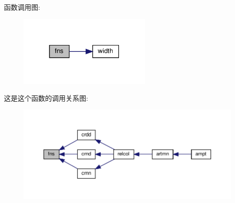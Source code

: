 函数调用图\+:
\nopagebreak
\begin{figure}[H]
\begin{center}
\leavevmode
\includegraphics[width=186pt]{fns_8f90_acb8b677be8ff0a35acfaf255b2cd7efd_cgraph}
\end{center}
\end{figure}
这是这个函数的调用关系图\+:
\nopagebreak
\begin{figure}[H]
\begin{center}
\leavevmode
\includegraphics[width=350pt]{fns_8f90_acb8b677be8ff0a35acfaf255b2cd7efd_icgraph}
\end{center}
\end{figure}
